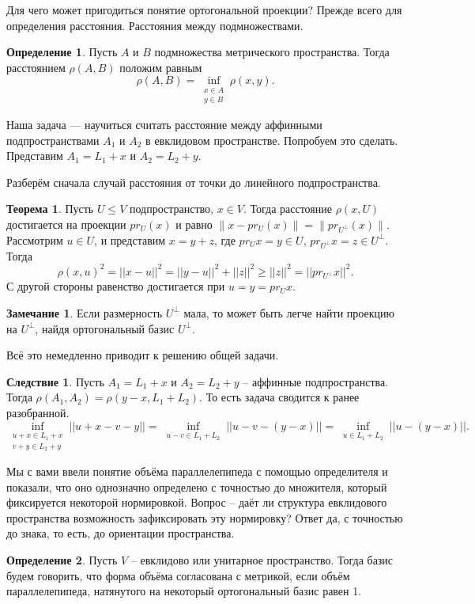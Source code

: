 \documentclass[10pt,a4paper,oneside]{book} %
\theoremstyle{definition}
\newtheorem*{rem}{Замечание}
\newtheorem*{defn}{Определение}
\newtheorem{thm}{Теорема}
\newtheorem{cor}{Следствие}
\def\thrm{\begin{thm}}
\def\ethrm{\end{thm}}
\def\dfn{\begin{defn}}
\def\edfn{\end{defn}}
\def\crl{\begin{cor}}
\def\ecrl{\end{cor}}
\def\rm{\begin{rem}}
\def\erm{\end{rem}}
\begin{document}
Для чего может пригодиться понятие ортогональной проекции? Прежде всего для определения расстояния. Расстояния между подмножествами.

\dfn Пусть $A$ и $B$ подмножества метрического пространства. Тогда расстоянием $\rho(A,B)$ положим равным
$$\rho(A,B)=\inf_{\substack{x\in A\\ y \in B}} \rho(x,y).$$
\edfn

Наша задача --- научиться считать расстояние между аффинными подпространствами $A_1$ и $A_2$ в евклидовом пространстве. Попробуем это сделать. Представим $A_1=L_1+x$ и $A_2=L_2+y$. 

Разберём сначала случай расстояния от точки до линейного подпространства. 

\thrm Пусть $U \leq V$ подпространство, $x \in V$. Тогда расстояние $\rho(x,U)$ достигается на проекции  $pr_U(x)$ и равно $\|x-pr_U(x)\|=\|pr_{U^{\bot}}(x)\|$.
\proof Рассмотрим $u \in U$, и представим $x=y+z$, где $pr_Ux=y \in U$, $pr_{U^{\bot}}x =z \in U^{\bot}$. Тогда $$\rho(x,u)^2= ||x-u||^2= ||y - u ||^2+ ||z||^2 \geq ||z||^2=||pr_{U^{\bot}}x||^2 .$$
С другой стороны равенство достигается при $u=y=pr_{U} x$.
\endproof
\ethrm



\rm Если размерность $U^{\bot}$ мала, то может быть легче найти проекцию на $U^{\bot}$, найдя ортогональный базис $U^{\bot}$.
\erm

Всё это немедленно приводит к решению общей задачи.

\crl Пусть  $A_1=L_1+x$ и $A_2=L_2+y$ -- аффинные подпространства. Тогда $\rho(A_1,A_2)=\rho(y-x, L_1+L_2)$. То есть задача сводится к ранее разобранной.
\proof $$\inf_{\substack{u+x\in L_1+x\\ v+y \in L_2+y}} ||u+x-v-y||=\inf_{\substack{u-v\in L_1+ L_2}}||u-v - (y-x)||=\inf_{\substack{u\in L_1+ L_2}}||u- (y-x)||.$$
\endproof
\ecrl

Мы с вами ввели понятие объёма параллелепипеда с помощью определителя и показали, что оно однозначно определено с точностью до множителя, который фиксируется некоторой нормировкой. Вопрос -- даёт ли структура евклидового пространства возможность зафиксировать эту нормировку? Ответ да, с точностью до знака, то есть, до ориентации пространства.

\dfn Пусть $V$ -- евклидово или унитарное пространство. Тогда базис будем говорить, что форма объёма согласована с метрикой, если объём параллелепипеда, натянутого на некоторый ортогональный базис равен 1.
\edfn
\end{document}
